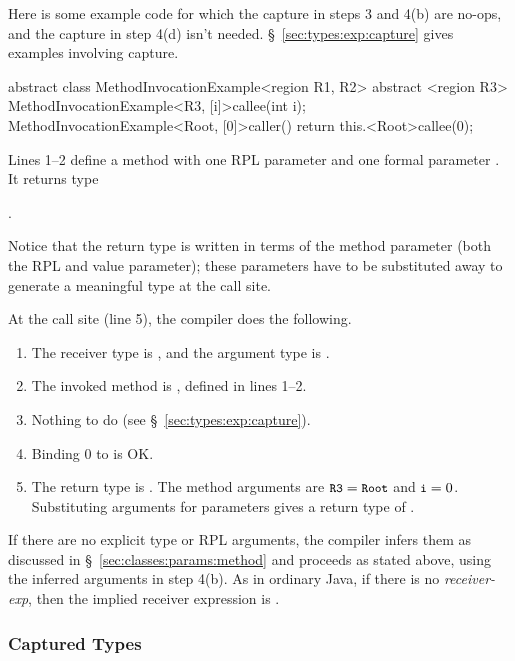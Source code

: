 Here is some example code for which the capture in steps 3 and 4(b)
are no-ops, and the capture in step 4(d) isn't needed.
\S~\ref{sec:types:exp:capture} gives examples involving capture.
%
\begin{numbereddpjlisting}
abstract class MethodInvocationExample<region R1, R2> {
  abstract <region R3>
    MethodInvocationExample<R3, [i]>callee(int i);
  MethodInvocationExample<Root, [0]>caller() {
    return this.<Root>callee(0);
  }
}
\end{numbereddpjlisting}
%
Lines 1--2 define a method  with one RPL parameter
 and one formal parameter .  It returns type
%
\begin{description}
\item {}.  
\end{description}
%
Notice that the return type is written in terms of the method
parameter (both the RPL and value parameter); these parameters have to
be substituted away to generate a meaningful type at the call site.

At the call site (line 5), the compiler does the following.  
%
\begin{enumerate}
%
\item The receiver type is ,
  and the argument type is .
%
\item The invoked method is , defined in lines 1--2.  
%
\item Nothing to do (see \S~\ref{sec:types:exp:capture}).
%
\item Binding 0 to  is OK.  
%
\item The return type is .  The
  method arguments are $\mbox{\small{\texttt{R3}}}=\mbox{\small{\texttt{Root}}}$ and $\mbox{\small{\texttt{i}}}=0$.
  Substituting arguments for parameters gives a return type of
  .
%
\end{enumerate}

 If there are no explicit
type or RPL arguments, the compiler infers them as discussed in
\S~\ref{sec:classes:params:method} and proceeds as stated above, using
the inferred arguments in step 4(b).  As in ordinary Java, if there is
no \emph{receiver-exp}, then the implied receiver expression is
.

\subsubsection{Captured Types%
\label{sec:types:exp:capture}}

